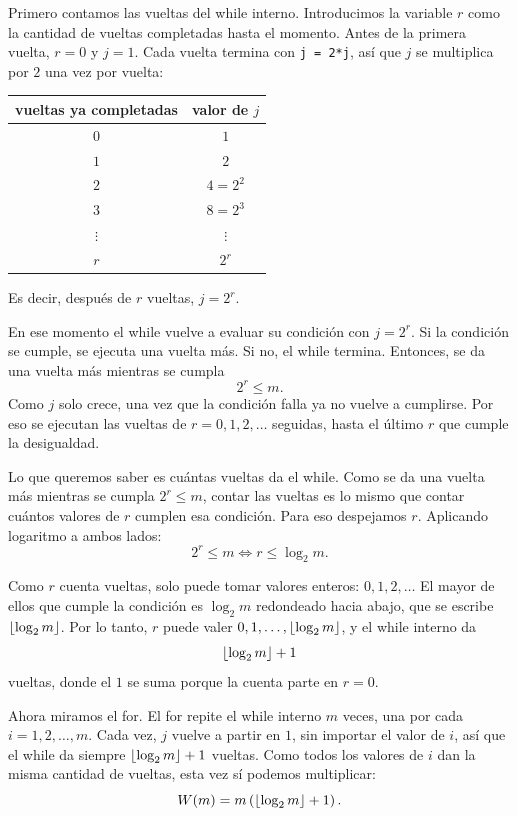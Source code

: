 Primero contamos las vueltas del while interno. Introducimos la variable $r$ como la
cantidad de vueltas completadas hasta el momento. Antes de la primera vuelta, $r = 0$ y
$j = 1$. Cada vuelta termina con \texttt{j = 2*j}, así que $j$ se multiplica por $2$ una
vez por vuelta:
\begin{center}
\begin{tabular}{cc}
  \toprule
  vueltas ya completadas & valor de $j$ \\
  \midrule
  $0$ & $1$ \\
  $1$ & $2$ \\
  $2$ & $4 = 2^2$ \\
  $3$ & $8 = 2^3$ \\
  $\vdots$ & $\vdots$ \\
  $r$ & $2^r$ \\
  \bottomrule
\end{tabular}
\end{center}
Es decir, después de $r$ vueltas, $j = 2^r$.

En ese momento el while vuelve a evaluar su condición con $j = 2^r$. Si la condición se
cumple, se ejecuta una vuelta más. Si no, el while termina. Entonces, se da una vuelta
más mientras se cumpla
\[
  2^r \le m.
\]
Como $j$ solo crece, una vez que la condición falla ya no vuelve a cumplirse. Por eso se
ejecutan las vueltas de $r = 0, 1, 2, \dots$ seguidas, hasta el último $r$ que cumple la
desigualdad.

Lo que queremos saber es cuántas vueltas da el while. Como se da una vuelta más mientras
se cumpla $2^r \le m$, contar las vueltas es lo mismo que contar cuántos valores de $r$
cumplen esa condición. Para eso despejamos $r$. Aplicando logaritmo a ambos lados:
\[
  2^r \le m \iff r \le \log_2 m.
\]

Como $r$ cuenta vueltas, solo puede tomar valores enteros: $0, 1, 2, \dots$ El mayor de
ellos que cumple la condición es $\log_2 m$ redondeado hacia abajo, que se escribe
$\lfloor\log_2 m\rfloor$. Por lo tanto, $r$ puede valer $0, 1, \dots, \lfloor\log_2 m\rfloor$, y el
while interno da
\[
  \lfloor\log_2 m\rfloor + 1
\]
vueltas, donde el $1$ se suma porque la cuenta parte en $r = 0$.

Ahora miramos el for. El for repite el while interno $m$ veces, una por cada
$i = 1, 2, \dots, m$. Cada vez, $j$ vuelve a partir en $1$, sin importar el valor de $i$,
así que el while da siempre $\lfloor\log_2 m\rfloor + 1$ vueltas. Como todos los valores de
$i$ dan la misma cantidad de vueltas, esta vez sí podemos multiplicar:
\[
  W(m) = m \left( \lfloor\log_2 m\rfloor + 1 \right).
\]


